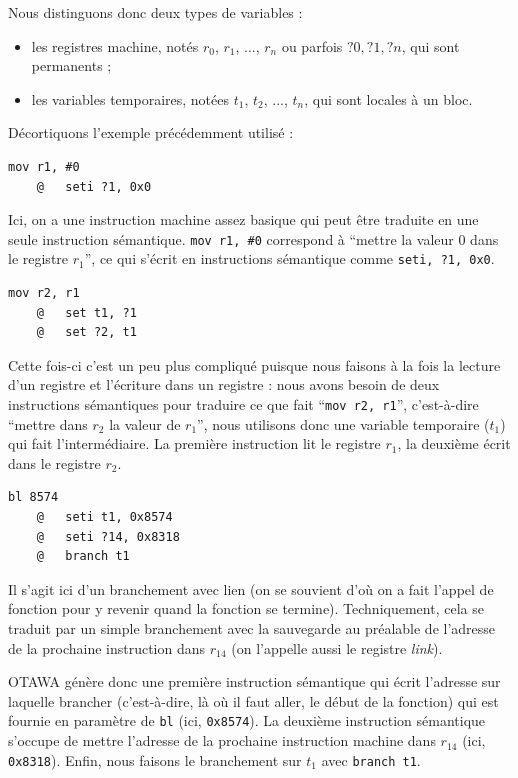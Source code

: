 \documentclass[french]{article}
\begin{document}
  Nous distinguons donc deux types de variables :

  \begin{itemize}
    \item les registres machine, notés $r_0$, $r_1$, ..., $r_n$ ou parfois $?0, ?1, ?n$, qui sont permanents ;
    \item les variables temporaires, notées $t_1$, $t_2$, ..., $t_n$, qui sont locales à un bloc.
  \end{itemize}

  Décortiquons l'exemple précédemment utilisé :

  \begin{lstlisting}[language={[ARM]Assembler}]
    mov r1, #0
    @	seti ?1, 0x0
  \end{lstlisting}

  Ici, on a une instruction machine assez basique qui peut être traduite en une seule instruction sémantique. \texttt{mov r1, \#0} correspond à ``mettre la valeur 0 dans le registre $r_1$'', ce qui s'écrit en instructions sémantique comme \texttt{seti, ?1, 0x0}.

  \begin{lstlisting}[language={[ARM]Assembler}]
    mov r2, r1
    @	set t1, ?1
    @	set ?2, t1
  \end{lstlisting}

  Cette fois-ci c'est un peu plus compliqué puisque nous faisons à la fois la lecture d'un registre et l'écriture dans un registre : nous avons besoin de deux instructions sémantiques pour traduire ce que fait ``\texttt{mov r2, r1}'', c'est-à-dire ``mettre dans $r_2$ la valeur de $r_1$'', nous utilisons donc une variable temporaire ($t_1$) qui fait l'intermédiaire. La première instruction lit le registre $r_1$, la deuxième écrit dans le registre $r_2$.

  \begin{lstlisting}[language={[ARM]Assembler}]
    bl 8574
    @	seti t1, 0x8574
    @	seti ?14, 0x8318
    @	branch t1
  \end{lstlisting}

  Il s'agit ici d'un branchement avec lien (on se souvient d'où on a fait l'appel de fonction pour y revenir quand la fonction se termine). Techniquement, cela se traduit par un simple branchement avec la sauvegarde au préalable de l'adresse de la prochaine instruction dans $r_{14}$ (on l'appelle aussi le registre \textit{link}).

  OTAWA génère donc une première instruction sémantique qui écrit l'adresse sur laquelle brancher (c'est-à-dire, là où il faut aller, le début de la fonction) qui est fournie en paramètre de \texttt{bl} (ici, \texttt{0x8574}). La deuxième instruction sémantique s'occupe de mettre l'adresse de la prochaine instruction machine dans $r_14$ (ici, \texttt{0x8318}). Enfin, nous faisons le branchement sur $t_1$ avec \texttt{branch t1}.
\end{document}

